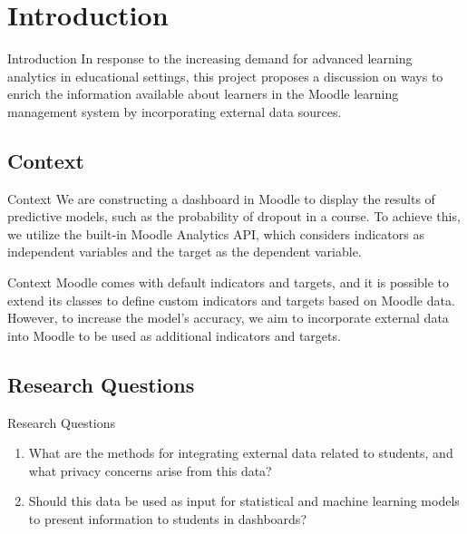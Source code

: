 \section{Introduction}

\begin{frame}{Introduction}
    In response to the increasing demand for advanced learning analytics in educational settings, 
    this project proposes a discussion on ways to enrich the information available about learners 
    in the Moodle learning management system by incorporating external data sources.
    \cite{park2015development}
\end{frame}

\subsection{Context}
\begin{frame}{Context}
    We are constructing a dashboard in Moodle to display the results of predictive models, 
    such as the probability of dropout in a course. 
    To achieve this, we utilize the built-in Moodle Analytics API, 
    which considers indicators as independent variables and the target as the dependent variable.
\end{frame}

\begin{frame}{Context}
    Moodle comes with default indicators and targets, and it is possible to extend its 
    classes to define custom indicators and targets based on Moodle data. 
    However, to increase the model's accuracy, we aim to incorporate external 
    data into Moodle to be used as additional indicators and targets.
\end{frame}

\subsection{Research Questions}
\begin{frame}{Research Questions}
    \begin{enumerate}[<+-|alert@+>]\color{gray}
        \item What are the methods for integrating external data related to students, and what privacy concerns arise from this data?
        \item Should this data be used as input for statistical and machine learning models to present information to students in dashboards?
    \end{enumerate}
\end{frame}